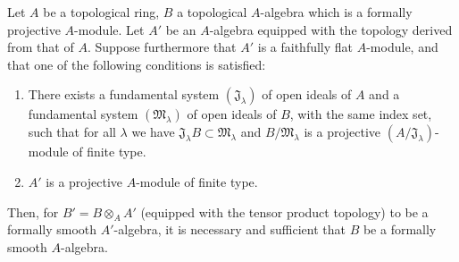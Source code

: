 \begin{corollary}[19.4.6]
\label{0.19.4.6}
Let $A$ be a topological ring, $B$ a topological $A$-algebra which is a formally projective $A$-module.
Let $A'$ be an $A$-algebra equipped with the topology derived from that of $A$.
Suppose furthermore that $A'$ is a faithfully flat $A$-module, and that one of the following conditions is satisfied:
\begin{enumerate}
  \item[$1^\circ$] There exists a fundamental system $(\mathfrak{J}_\lambda)$ of open ideals of $A$ and a fundamental system $(\mathfrak{M}_\lambda)$ of open ideals of $B$, with the same index set, such that for all $\lambda$ we have $\mathfrak{J}_\lambda B\subset\mathfrak{M}_\lambda$ and $B/\mathfrak{M}_\lambda$ is a projective $(A/\mathfrak{J}_\lambda)$-module of finite type.
  \item[$2^\circ$] $A'$ is a projective $A$-module of finite type.
\end{enumerate}
Then, for $B'=B\otimes_A A'$ (equipped with the tensor product topology) to be a formally smooth $A'$-algebra, it is necessary and sufficient that $B$ be a formally smooth $A$-algebra.
\end{corollary}

